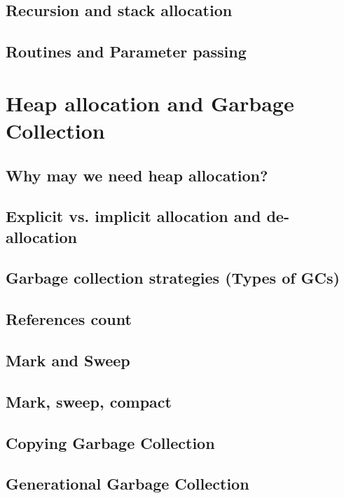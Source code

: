 \documentclass{article}
\begin{document}
\subsection{Recursion and stack allocation}

\subsection{Routines and Parameter passing}

\pagebreak

\section{Heap allocation and Garbage Collection}

\subsection{Why may we need heap allocation?}

\subsection{Explicit vs. implicit allocation and de-allocation}

\subsection{Garbage collection strategies (Types of GCs)}

\subsection{References count}

\subsection{Mark and Sweep}

\subsection{Mark, sweep, compact}

\subsection{Copying Garbage Collection}

\subsection{Generational Garbage Collection}
\end{document}

